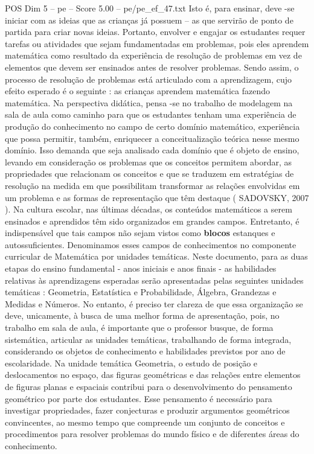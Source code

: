 \begin{textsample}{POS Dim 5 – pe – Score 5.00 – pe/pe\_ef\_47.txt}
Isto é, para ensinar, deve -se iniciar com as ideias que as crianças já possuem – as que servirão de ponto de partida para criar novas ideias.
Portanto, envolver e engajar os estudantes requer tarefas ou atividades que sejam fundamentadas em problemas, pois eles aprendem matemática como resultado da experiência de resolução de problemas em vez de elementos que devem ser ensinados antes de resolver problemas.
Sendo assim, o processo de resolução de problemas está articulado com a aprendizagem, cujo efeito esperado é o seguinte : as crianças aprendem matemática fazendo matemática.
Na perspectiva didática, pensa -se no trabalho de modelagem na sala de aula como caminho para que os estudantes tenham uma experiência de produção do conhecimento no campo de certo domínio matemático, experiência que possa permitir, também, enriquecer a conceitualização teórica nesse mesmo domínio.
Isso demanda que seja analisado cada domínio que é objeto de ensino, levando em consideração os problemas que os conceitos permitem abordar, as propriedades que relacionam os conceitos e que se traduzem em estratégias de resolução na medida em que possibilitam transformar as relações envolvidas em um problema e as formas de representação que têm destaque ( SADOVSKY, 2007 ).
Na cultura escolar, nas últimas décadas, os conteúdos matemáticos a serem ensinados e aprendidos têm sido organizados em grandes campos.
Entretanto, é indispensável que tais campos não sejam vistos como \textbf{blocos} estanques e autossuficientes.
Denominamos esses campos de conhecimentos no componente curricular de Matemática por unidades temáticas.
Neste documento, para as duas etapas do ensino fundamental - anos iniciais e anos finais - as habilidades relativas às aprendizagens esperadas serão apresentadas pelas seguintes unidades temáticas : Geometria, Estatística e Probabilidade, Álgebra, Grandezas e Medidas e Números.
No entanto, é preciso ter clareza de que essa organização se deve, unicamente, à busca de uma melhor forma de apresentação, pois, no trabalho em sala de aula, é importante que o professor busque, de forma sistemática, articular as unidades temáticas, trabalhando de forma integrada, considerando os objetos de conhecimento e habilidades previstos por ano de escolaridade.
Na unidade temática Geometria, o estudo de posição e deslocamentos no espaço, das figuras geométricas e das relações entre elementos de figuras planas e espaciais contribui para o desenvolvimento do pensamento geométrico por parte dos estudantes.
Esse pensamento é necessário para investigar propriedades, fazer conjecturas e produzir argumentos geométricos convincentes, ao mesmo tempo que compreende um conjunto de conceitos e procedimentos para resolver problemas do mundo físico e de diferentes áreas do conhecimento.

\end{textsample}

